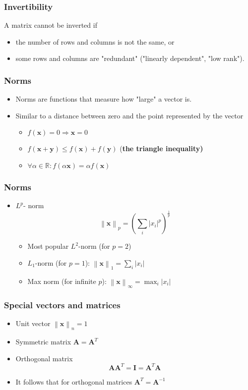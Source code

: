 \documentclass[notes]{beamer}          %
\newcommand{\vect}[1]{\bm{#1}}
\newcommand{\field}[1]{\mathbb{#1}}
\newcommand{\R}{\field{R}}
\newcommand{\norm}[1]{\left\lVert#1\right\rVert}
\providecommand{\norm}[1]{\lVert#1\rVert}
\begin{document}
\begin{frame}
\frametitle{Invertibility}
    A matrix cannot be inverted if
    \begin{itemize}
        \item the number of rows and columns is not the same, or
        \item some rows and columns are "redundant" ("linearly dependent", "low rank").
    \end{itemize}
\end{frame}

\begin{frame}
\frametitle{Norms}
    \begin{itemize}
        \item Norms are functions that measure how "large" a vector is.
        \item Similar to a distance between zero and the point represented by the vector
        \begin{itemize}
           \item $f(\vect{x}) = 0 \Rightarrow \vect{x} = 0$
           \item $f(\vect{x} + \vect{y}) \leq f(\vect{x}) + f(\vect{y})$ (\bf the triangle inequality)
           \item $\forall \alpha \in \R: f(\alpha \vect{x}) = \alpha f(\vect{x})$
        \end{itemize}
    \end{itemize}
\end{frame}

\begin{frame}
\frametitle{Norms}
    \begin{itemize}
        \item $L^p$- norm
        $$\norm{\vect{x}}_p = \left( \sum_i |x_i|^p  \right) ^{\frac{1}{p}}$$
        \begin{itemize}
            \item Most popular $L^2$-norm (for $p=2$)
            \item $L_1$-norm (for $p = 1$): $\norm{\vect{x}}_1 = \sum_i |x_i|$
            \item Max norm (for infinite $p$): $\norm{\vect{x}}_\infty = \max_i |x_i|$
            \end{itemize}
    \end{itemize}

\end{frame}

\begin{frame}
\frametitle{Special vectors and matrices}
    \begin{itemize}
        \item Unit vector $\norm{\vect{x}}_n = 1$
        \item Symmetric matrix $\vect{A} = \vect{A}^T$
        \item Orthogonal matrix $$\vect{A}\vect{A}^T = \vect{I} = \vect{A}^T \vect{A}$$
        \item It follows that for orthogonal matrices  $\vect{A}^T = \vect{A}^{-1}$
    \end{itemize}
\end{frame}
\end{document}
